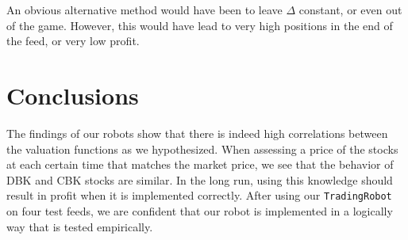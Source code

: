 \documentclass[a4paper]{article}
\begin{document}
An obvious alternative method would have been to leave $\Delta$ constant, or even out of the game. However, this would have lead to very high positions in the end of the feed, or very low profit. 

\section{Conclusions}

The findings of our robots show that there is indeed high correlations between the valuation functions as we hypothesized. When assessing a price of the stocks at each certain time that matches the market price, we see that the behavior of DBK and CBK stocks are similar. In the long run, using this knowledge should result in profit when it is implemented correctly. After using our  \texttt{TradingRobot} on four test feeds, we are confident that our robot is implemented in a logically way that is tested empirically.  
\end{document}
